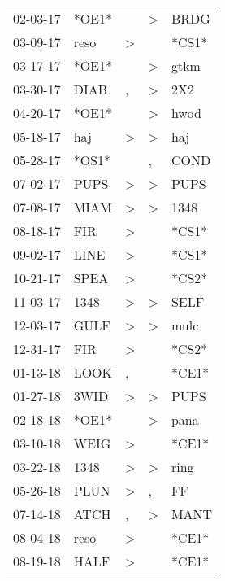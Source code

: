 \begin{supertabular}{lllll}
 02-03-17 &  *OE1* &                  &     \textgreater &   BRDG \\
 03-09-17 &   reso &     \textgreater &                  &  *CS1* \\
 03-17-17 &  *OE1* &                  &     \textgreater &   gtkm \\
 03-30-17 &   DIAB &                , &     \textgreater &    2X2 \\
 04-20-17 &  *OE1* &                  &     \textgreater &   hwod \\
 05-18-17 &    haj &     \textgreater &     \textgreater &    haj \\
 05-28-17 &  *OS1* &                  &                , &   COND \\
 07-02-17 &   PUPS &     \textgreater &     \textgreater &   PUPS \\
 07-08-17 &   MIAM &     \textgreater &     \textgreater &   1348 \\
 08-18-17 &    FIR &     \textgreater &                  &  *CS1* \\
 09-02-17 &   LINE &     \textgreater &                  &  *CS1* \\
 10-21-17 &   SPEA &     \textgreater &                  &  *CS2* \\
 11-03-17 &   1348 &     \textgreater &     \textgreater &   SELF \\
 12-03-17 &   GULF &     \textgreater &     \textgreater &   mulc \\
 12-31-17 &    FIR &     \textgreater &                  &  *CS2* \\
 01-13-18 &   LOOK &                , &                  &  *CE1* \\
 01-27-18 &   3WID &     \textgreater &     \textgreater &   PUPS \\
 02-18-18 &  *OE1* &                  &     \textgreater &   pana \\
 03-10-18 &   WEIG &     \textgreater &                  &  *CE1* \\
 03-22-18 &   1348 &     \textgreater &     \textgreater &   ring \\
 05-26-18 &   PLUN &     \textgreater &                , &     FF \\
 07-14-18 &   ATCH &                , &     \textgreater &   MANT \\
 08-04-18 &   reso &     \textgreater &                  &  *CE1* \\
 08-19-18 &   HALF &     \textgreater &                  &  *CE1* \\

\end{supertabular}
